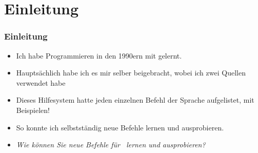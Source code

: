 \documentclass[aspectratio=169,mathserif,notheorems]{beamer}%
\subtitle{9.~Zwischenspiel:~Python Dokumentation und Informationsquellen}%
\begin{document}
%
%
\startPresentation%
%
\section{Einleitung}%
\begin{frame}%
\frametitle{Einleitung}%
\parbox{0.65\linewidth}{%
\begin{itemize}%
\item Ich habe Programmieren in den 1990ern mit \cite{B1992TPV7UB} gelernt.%
\item<2-> Hauptsächlich habe ich es mir selber beigebracht, wobei ich zwei Quellen verwendet habe%
%
\item<5-> Dieses Hilfesystem hatte jeden einzelnen Befehl der Sprache aufgelistet, mit Beispielen!%
\item<6-> So konnte ich selbstständig neue Befehle lernen und ausprobieren.%
\item<7-> \emph{Wie können Sie neue Befehle für \python\ lernen und ausprobieren?}
\end{itemize}}%
%
%
\end{frame}%
%
\end{document}

